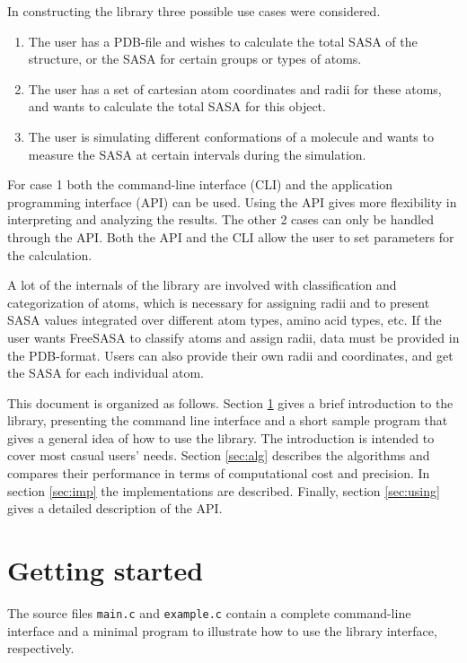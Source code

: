 \documentclass[a4paper,11pt]{article}
\begin{document}
In constructing the library three possible use cases were considered. 
\begin{enumerate}
\item The user has a PDB-file and wishes to calculate the total SASA of
  the structure, or the SASA for certain groups or types of atoms.
\item The user has a set of cartesian atom coordinates and radii for
  these atoms, and wants to calculate the total SASA for this object.
\item The user is simulating different conformations of a molecule and
  wants to measure the SASA at certain intervals during the simulation.
\end{enumerate}
For case 1 both the command-line interface (CLI) and the application
programming interface (API) can be used. Using the API gives more
flexibility in interpreting and analyzing the results. The other 2
cases can only be handled through the API. Both the API and the CLI
allow the user to set parameters for the calculation. 

A lot of the internals of the library are involved with classification
and categorization of atoms, which is necessary for assigning radii
and to present SASA values integrated over different atom types, amino
acid types, etc. If the user wants FreeSASA to classify atoms and
assign radii, data must be provided in the PDB-format. Users can also
provide their own radii and coordinates, and get the SASA for each
individual atom.

This document is organized as follows. Section \ref{sec:howto_short}
gives a brief introduction to the library, presenting the command line
interface and a short sample program that gives a general idea of how
to use the library. The introduction is intended to cover most casual
users' needs. Section \ref{sec:alg} describes the algorithms and
compares their performance in terms of computational cost and
precision. In section \ref{sec:imp} the implementations are
described. Finally, section \ref{sec:using} gives a detailed
description of the API.

\section{Getting started}\label{sec:howto_short}

The source files \verb|main.c| and \verb|example.c| contain
a complete command-line interface and a minimal program to illustrate
how to use the library interface, respectively. 
\end{document}
